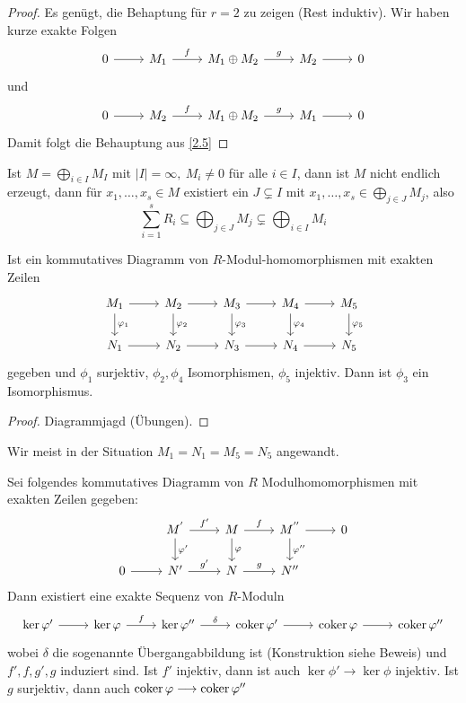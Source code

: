 \begin{proof}
	Es genügt, die Behaptung für $r=2$ zu zeigen (Rest induktiv). Wir haben kurze exakte Folgen $$\begin{tikzcd}
	0  \arrow{r} & M_1 \arrow{r}{f} & M_1 \oplus M_2 \arrow{r}{g} & M_2 \arrow{r} & 0
	\end{tikzcd} $$
	 und
	$$\begin{tikzcd}
	0  \arrow{r} & M_2 \arrow{r}{f} & M_1 \oplus M_2 \arrow{r}{g} & M_1 \arrow{r} & 0
	\end{tikzcd} $$
	Damit folgt die Behauptung aus \ref{2.5}
\end{proof}
\begin{anm}
	Ist $M= \bigoplus_{i\in I} M_I$ mit $|I| = \infty, \ M_i \neq 0$ für alle $i\in I$, dann ist $M$ nicht endlich erzeugt, dann für $x_1, \ldots, x_s\in M$ existiert ein $J\subsetneq I$ mit $ x_1, \ldots, x_s \in \bigoplus_{j\in J} M_j$, also $$\sum_{i=1}^s R_i \subseteq \bigoplus_{j\in J} M_j\subsetneq \bigoplus_{i\in I} M_i$$
\end{anm}
\begin{bem}[Fünferlemma]\label{2.8} Ist ein kommutatives Diagramm von $R$-Modul-homomorphismen mit exakten Zeilen 
	$$\begin{tikzcd}
	M_1 \arrow{r} \arrow{d}{\phi_1}& M_2 \arrow{r}\arrow{d}{\phi_2}& M_3 \arrow{r} \arrow{d}{\phi_3} & M_4 \arrow{r} \arrow{d}{\phi_4} & M_5 \arrow{d}{\phi_5}\\
	N_1 \arrow{r}& N_2 \arrow{r}& N_3 \arrow{r} & N_4 \arrow{r} & N_5
	\end{tikzcd}$$
	gegeben und $\phi_1$ surjektiv, $\phi_2, \phi_4$ Isomorphismen, $\phi_5$ injektiv. Dann ist $\phi_3$ ein Isomorphismus.
\end{bem}
\begin{proof}
	Diagrammjagd (Übungen).
\end{proof}
\begin{anm}
	Wir meist in der Situation $M_1 = N_1 = M_5 = N_5$ angewandt.
\end{anm}
\begin{bem}[Schlangenlemma]\label{2.9}
	Sei folgendes kommutatives Diagramm von $R$ Modulhomomorphismen mit exakten Zeilen gegeben:
	$$\begin{tikzcd}
& M^{'} \arrow{r}{f'}\arrow{d}{\phi'}& M \arrow{r}{f} \arrow{d}{\phi} & M^{''} \arrow{d}{\phi''} \arrow{r}& 0\\
	0 \arrow{r}& N' \arrow{r}{g'}& N \arrow{r}{g} & N''
	\end{tikzcd}$$
	Dann existiert eine exakte Sequenz von $R$-Moduln 
	$$\begin{tikzcd}
	\ker \phi'  \arrow{r} & \ker \phi \arrow{r}{f} & \ker \phi'' \arrow{r}{\delta} & \coker \phi'  \arrow{r} &  \coker \phi \arrow{r} & \coker \phi''
	\end{tikzcd} $$
	wobei $\delta$ die sogenannte Übergangabbildung ist (Konstruktion siehe Beweis) und $f',f,g',g$ induziert sind. Ist $f'$ injektiv, dann ist auch $\ker \phi' \longrightarrow \ker \phi$ injektiv. Ist $g$ surjektiv, dann auch $\operatorname{coker} \varphi \longrightarrow \operatorname{coker} \varphi''$
	
\end{bem}
